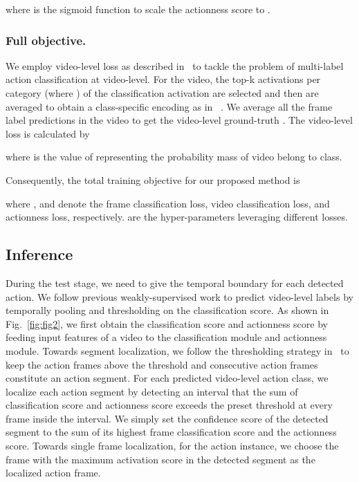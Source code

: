 \documentclass[runningheads]{llncs}
\begin{document}
	where  is the sigmoid function to scale the actionness score to .
	
	
	
	\subsubsection{Full objective.}
	
	We employ video-level loss as described in~\cite{Narayan_2019_ICCV} to tackle the problem of multi-label action classification at video-level. 
	For the  video, the top-k activations per category (where ) of the classification activation  are selected and then are averaged to obtain a class-specific encoding  as in ~\cite{paul2018w,Narayan_2019_ICCV}. 
	We average all the frame label predictions in the video  to get the video-level ground-truth .
	The video-level loss is calculated by
	
	
	where  is the  value of  representing the probability mass of video  belong to  class.
	
	Consequently, the total training objective for our proposed method is
	
	where ,  and  denote the frame classification loss, video classification loss, and actionness loss, respectively.  are the hyper-parameters leveraging different losses. 
	
	
	
	
	
	\subsection{Inference} 
	
	During the test stage, we need to give the temporal boundary for each detected action.
	We follow previous weakly-supervised work \cite{nguyen2018weakly} to predict video-level labels by temporally pooling and thresholding on the classification score.
	As shown in Fig.~\ref{fig:fig2}, we first obtain the classification score  and actionness score  by feeding input features of a video to the classification module and actionness module.
	Towards segment localization, we follow the thresholding strategy in~\cite{nguyen2018weakly,Nguyen_2019_ICCV} to keep the action frames above the threshold and consecutive action frames constitute an action segment. 
	For each predicted video-level action class, we localize each action segment by detecting an interval that the sum of classification score and actionness score exceeds the preset threshold at every frame inside the interval.
	We simply set the confidence score of the detected segment to the sum of its highest frame classification score and the actionness score.
	Towards single frame localization, for the action instance, we choose the frame with the maximum activation score in the detected segment as the localized action frame. 
	
\end{document}
